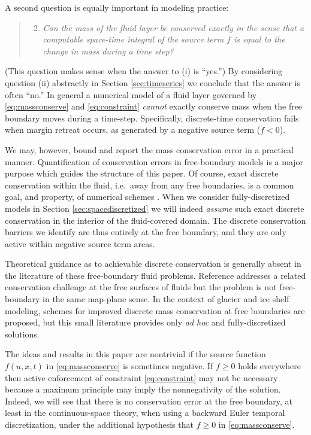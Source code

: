 \documentclass[final,onefignum]{siamart190516}
\begin{document}
A second question is equally important in modeling practice:
  \begin{quote}
  \renewcommand{\labelenumi}{(\roman{enumi})}
  \begin{enumerate}
  \setcounter{enumi}{1}
  \item \emph{Can the mass of the fluid layer be conserved exactly in the sense that a computable space-time integral of the source term $f$ is equal to the change in mass during a time step?}
  \end{enumerate}
  \end{quote}
(This question makes sense when the answer to (i) is ``yes.'')  By considering question (ii) abstractly in Section \ref{sec:timeseries} we conclude that the answer is often ``no.''  In general a numerical model of a fluid layer governed by \eqref{eq:massconserve} and \eqref{eq:constraint} \emph{cannot} exactly conserve mass when the free boundary moves during a time-step.  Specifically, discrete-time conservation fails when margin retreat occurs, as generated by a negative source term ($f<0$).

We may, however, bound and report the mass conservation error in a practical manner.  Quantification of conservation errors in free-boundary models is a major purpose which guides the structure of this paper.  Of course, exact discrete conservation within the fluid, i.e.~away from any free boundaries, is a common goal, and property, of numerical schemes \cite[and references therein]{LeVeque2002}.  When we consider fully-discretized models in Section \ref{sec:spacediscretized} we will indeed \emph{assume} such exact discrete conservation in the interior of the fluid-covered domain.  The discrete conservation barriers we identify are thus entirely at the free boundary, and they are only active within negative source term areas.

Theoretical guidance as to achievable discrete conservation is generally absent in the literature of these free-boundary fluid problems.  Reference \cite{IdelsohnOnate2010} addresses a related conservation challenge at the free surfaces of fluids but the problem is not free-boundary in the same map-plane sense.  In the context of glacier \cite{JaroschSchoofAnslow2013} and ice shelf \cite{Albrechtetal2011} modeling, schemes for improved discrete mass conservation at free boundaries are proposed, but this small literature provides only \emph{ad hoc} and fully-discretized solutions.

The ideas and results in this paper are nontrivial if the source function $f(u,x,t)$ in \eqref{eq:massconserve} is sometimes negative.  If $f\ge 0$ holds everywhere then active enforcement of constraint \eqref{eq:constraint} may not be necessary because a maximum principle may imply the nonnegativity of the solution.  Indeed, we will see that there is no conservation error at the free boundary, at least in the continuous-space theory, when using a backward Euler temporal discretization, under the additional hypothesis that $f\ge 0$ in \eqref{eq:massconserve}.
\end{document}
